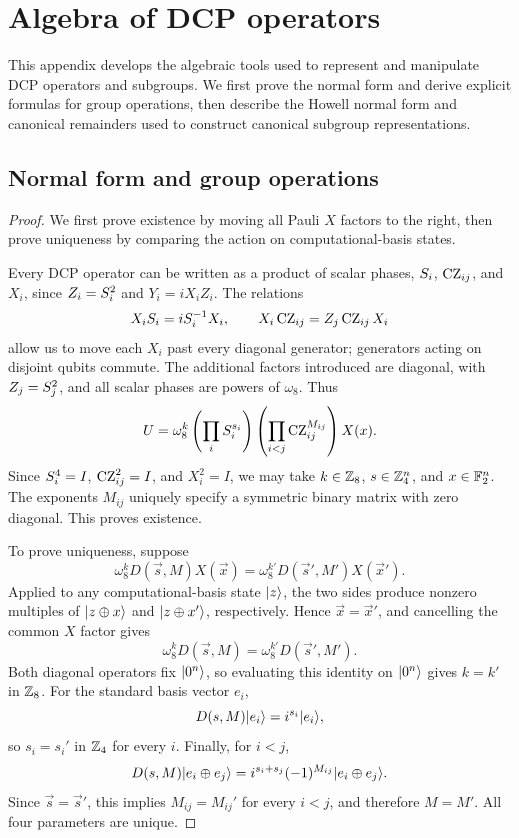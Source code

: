 \section{Algebra of DCP operators} \label{appendix:dcp-algebra}

This appendix develops the algebraic tools used to represent and manipulate DCP operators and subgroups.
We first prove the normal form and derive explicit formulas for group operations, then describe the Howell normal form and canonical remainders used to construct canonical subgroup representations.

\subsection{Normal form and group operations}

\begin{dcpnormalformrestatement}
\dcpNormalFormStatement
\end{dcpnormalformrestatement}
\begin{proof}
    We first prove existence by moving all Pauli $X$ factors to
    the right, then prove uniqueness by comparing the action on
    computational-basis states.

    Every DCP operator can be written as a product of scalar
    phases, $\S_i$, $\CZ_{ij}$, and $X_i$, since
    $Z_i=\S_i^2$ and $Y_i=iX_iZ_i$. The relations
    \[
    X_i\S_i=i\S_i^{-1}X_i,
    \qquad
    X_i\CZ_{ij}=Z_j\CZ_{ij}X_i
    \]
    allow us to move each $X_i$ past every diagonal generator;
    generators acting on disjoint qubits commute. The additional
    factors introduced are diagonal, with $Z_j=\S_j^2$, and all
    scalar phases are powers of $\omega_8$. Thus
    \[
    U=\omega_8^k
    \left(\prod_i \S_i^{s_i}\right)
    \left(\prod_{i<j}\CZ_{ij}^{M_{ij}}\right)
    X(\vec{x}).
    \]
    Since $\S_i^4=I$, $\CZ_{ij}^2=I$, and $X_i^2=I$, we may
    take $k\in\Z_8$, $\vec{s}\in\Z_4^n$, and
    $\vec{x}\in\F_2^n$. The exponents $M_{ij}$ uniquely specify
    a symmetric binary matrix with zero diagonal. This proves
    existence.

    To prove uniqueness, suppose
    \[
    \omega_8^k D(\vec{s},M)X(\vec{x})
    =
    \omega_8^{k'}D(\vec{s}',M')X(\vec{x}').
    \]
    Applied to any computational-basis state $\ket{z}$, the two
    sides produce nonzero multiples of $\ket{z\oplus\vec{x}}$
    and $\ket{z\oplus\vec{x}'}$, respectively. Hence
    $\vec{x}=\vec{x}'$, and cancelling the common $X$ factor gives
    \[
    \omega_8^k D(\vec{s},M)
    =
    \omega_8^{k'}D(\vec{s}',M').
    \]
    Both diagonal operators fix $\ket{0^n}$, so evaluating this
    identity on $\ket{0^n}$ gives $k=k'$ in $\Z_8$.
    For the standard basis vector $e_i$,
    \[
    D(\vec{s},M)\ket{e_i}=i^{s_i}\ket{e_i},
    \]
    so $s_i=s_i'$ in $\Z_4$ for every $i$. Finally, for $i<j$,
    \[
    D(\vec{s},M)\ket{e_i\oplus e_j}
    =
    i^{s_i+s_j}(-1)^{M_{ij}}\ket{e_i\oplus e_j}.
    \]
    Since $\vec{s}=\vec{s}'$, this implies $M_{ij}=M_{ij}'$
    for every $i<j$, and therefore $M=M'$. All four parameters
    are unique.
\end{proof}

